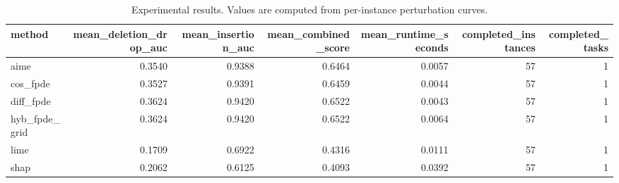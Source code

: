 \begin{table}[t]
\caption{Experimental results. Values are computed from per-instance perturbation curves.}
\label{tab:main_results_computed}
\centering
\begin{tabular}{lrrrrrr}
\toprule
method & mean\_deletion\_drop\_auc & mean\_insertion\_auc & mean\_combined\_score & mean\_runtime\_seconds & completed\_instances & completed\_tasks \\
\midrule
aime & 0.3540 & 0.9388 & 0.6464 & 0.0057 & 57 & 1 \\
cos\_fpde & 0.3527 & 0.9391 & 0.6459 & 0.0044 & 57 & 1 \\
diff\_fpde & 0.3624 & 0.9420 & 0.6522 & 0.0043 & 57 & 1 \\
hyb\_fpde\_grid & 0.3624 & 0.9420 & 0.6522 & 0.0064 & 57 & 1 \\
lime & 0.1709 & 0.6922 & 0.4316 & 0.0111 & 57 & 1 \\
shap & 0.2062 & 0.6125 & 0.4093 & 0.0392 & 57 & 1 \\
\bottomrule
\end{tabular}

\end{table}
